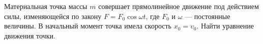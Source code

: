 Материальная точка массы $m$ совершает прямолинейное движение под
действием силы, изменяющейся по закону $F=F_0 \cos \omega t$, где $F_0$
и $\omega$ --- постоянные величины. В начальный момент точка имела
скорость $x_0=v_0$. Найти уравнение движения точки.
